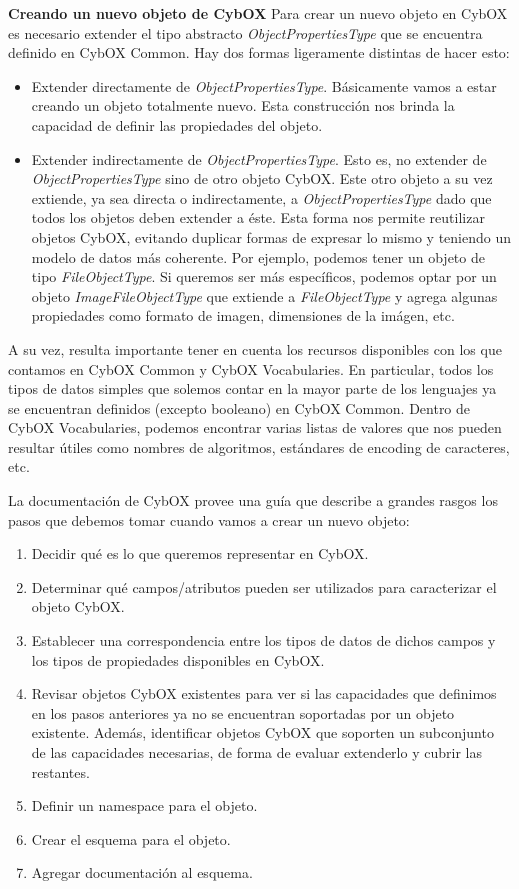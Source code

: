 \textbf{Creando un nuevo objeto de CybOX} \newline
Para crear un nuevo objeto en CybOX es necesario extender el tipo abstracto \emph{ObjectPropertiesType} que se encuentra definido en CybOX Common. Hay dos formas ligeramente distintas de hacer esto:

\begin{itemize}
\item Extender directamente de \emph{ObjectPropertiesType}. Básicamente vamos a estar creando un objeto totalmente nuevo. Esta construcción nos brinda la capacidad de definir las propiedades del objeto.
\item Extender indirectamente de \emph{ObjectPropertiesType}. Esto es, no extender de \emph{ObjectPropertiesType} sino de otro objeto CybOX. Este otro objeto a su vez extiende, ya sea directa o indirectamente, a \emph{ObjectPropertiesType} dado que todos los objetos deben extender a éste.
Esta forma nos permite reutilizar objetos CybOX, evitando duplicar formas de expresar lo mismo y teniendo un modelo de datos más coherente.
Por ejemplo, podemos tener un objeto de tipo \emph{FileObjectType}. Si queremos ser más específicos, podemos optar por un objeto \emph{ImageFileObjectType} que extiende a \emph{FileObjectType} y agrega algunas propiedades como formato de imagen, dimensiones de la imágen, etc.
\end{itemize}

A su vez, resulta importante tener en cuenta los recursos disponibles con los que contamos en CybOX Common y CybOX Vocabularies. En particular, todos los tipos de datos simples que solemos contar en la mayor parte de los lenguajes ya se encuentran definidos (excepto booleano) en CybOX Common. Dentro de CybOX Vocabularies, podemos encontrar varias listas de valores que nos pueden resultar útiles como nombres de algoritmos, estándares de encoding de caracteres, etc.

La documentación de CybOX \cite{cyboxGitHub} provee una guía que describe a grandes rasgos los pasos que debemos tomar cuando vamos a crear un nuevo objeto:

\begin{enumerate}
\item Decidir qué es lo que queremos representar en CybOX.
\item Determinar qué campos/atributos pueden ser utilizados para caracterizar el objeto CybOX.
\item Establecer una correspondencia entre los tipos de datos de dichos campos y los tipos de propiedades disponibles en CybOX.
\item Revisar objetos CybOX existentes para ver si las capacidades que definimos en los pasos anteriores ya no se encuentran soportadas por un objeto existente. Además, identificar objetos CybOX que soporten un subconjunto de las capacidades necesarias, de forma de evaluar extenderlo y cubrir las restantes.
\item Definir un namespace para el objeto.
\item Crear el esquema para el objeto.
\item Agregar documentación al esquema.
\end{enumerate}

